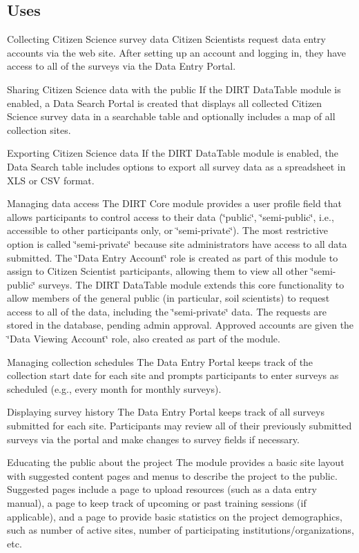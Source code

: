 \subsection*{Uses}


\begin{DoxyItemize}
\item Collecting Citizen Science survey data Citizen Scientists request data entry accounts via the web site. After setting up an account and logging in, they have access to all of the surveys via the Data Entry Portal.
\item Sharing Citizen Science data with the public If the D\+I\+RT Data\+Table module is enabled, a Data Search Portal is created that displays all collected Citizen Science survey data in a searchable table and optionally includes a map of all collection sites.
\item Exporting Citizen Science data If the D\+I\+RT Data\+Table module is enabled, the Data Search table includes options to export all survey data as a spreadsheet in X\+LS or C\+SV format.
\item Managing data access The D\+I\+RT Core module provides a user profile field that allows participants to control access to their data (\char`\"{}public\char`\"{}, \char`\"{}semi-\/public\char`\"{}, i.\+e., accessible to other participants only, or \char`\"{}semi-\/private\char`\"{}). The most restrictive option is called \char`\"{}semi-\/private\char`\"{} because site administrators have access to all data submitted. The \char`\"{}\+Data Entry Account\char`\"{} role is created as part of this module to assign to Citizen Scientist participants, allowing them to view all other \char`\"{}semi-\/public\char`\"{} surveys. The D\+I\+RT Data\+Table module extends this core functionality to allow members of the general public (in particular, soil scientists) to request access to all of the data, including the \char`\"{}semi-\/private\char`\"{} data. The requests are stored in the database, pending admin approval. Approved accounts are given the \char`\"{}\+Data Viewing 
\+Account\char`\"{} role, also created as part of the module.
\item Managing collection schedules The Data Entry Portal keeps track of the collection start date for each site and prompts participants to enter surveys as scheduled (e.\+g., every month for monthly surveys).
\item Displaying survey history The Data Entry Portal keeps track of all surveys submitted for each site. Participants may review all of their previously submitted surveys via the portal and make changes to survey fields if necessary.
\item Educating the public about the project The module provides a basic site layout with suggested content pages and menus to describe the project to the public. Suggested pages include a page to upload resources (such as a data entry manual), a page to keep track of upcoming or past training sessions (if applicable), and a page to provide basic statistics on the project demographics, such as number of active sites, number of participating institutions/organizations, etc.
\end{DoxyItemize}

